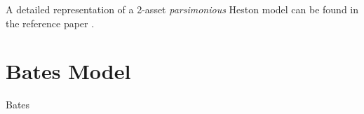 A detailed representation of a 2-asset \textit{parsimonious} Heston model can be found in the reference paper \cite{PARSIMONIOUS2011}.

\section{Bates Model}
Bates 

